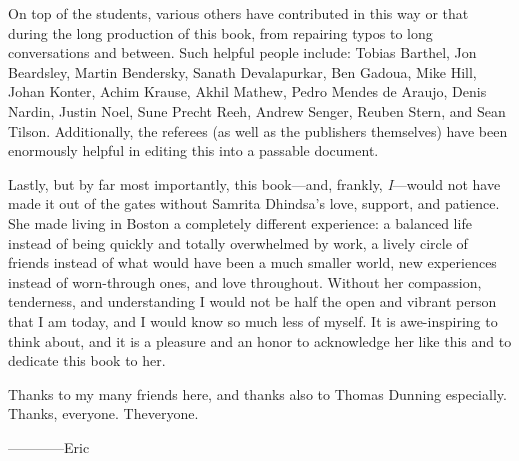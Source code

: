 On top of the students, various others have contributed in this way or that during the long production of this book, from repairing typos to long conversations and between.  Such helpful people include: Tobias Barthel, Jon Beardsley, Martin Bendersky, Sanath Devalapurkar, Ben Gadoua, Mike Hill, Johan Konter, Achim Krause, Akhil Mathew, Pedro Mendes de Araujo, Denis Nardin, Justin Noel, Sune Precht Reeh, Andrew Senger, Reuben Stern, and Sean Tilson.  Additionally, the referees (as well as the publishers themselves) have been enormously helpful in editing this into a passable document.

Lastly, but by far most importantly, this book---and, frankly, \emph{I}---would not have made it out of the gates without Samrita Dhindsa's love, support, and patience.  She made living in Boston a completely different experience: a balanced life instead of being quickly and totally overwhelmed by work, a lively circle of friends instead of what would have been a much smaller world, new experiences instead of worn-through ones, and love throughout.  Without her compassion, tenderness, and understanding I would not be half the open and vibrant person that I am today, and I would know so much less of myself.  It is awe-inspiring to think about, and it is a pleasure and an honor to acknowledge her like this and to dedicate this book to her.

Thanks to my many friends here, and thanks also to Thomas Dunning especially.  Thanks, everyone.  Theveryone.

\vspace{2\baselineskip}
\hspace{3em} ------------Eric
